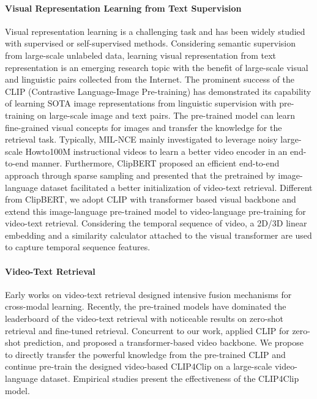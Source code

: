 \documentclass[11pt]{article}
\begin{document}
	\paragraph{Visual Representation Learning from Text Supervision}
    Visual representation learning is a challenging task and has been widely studied with supervised or self-supervised methods. Considering semantic supervision from large-scale unlabeled data, learning visual representation from text representation \cite{radford2021learning, miech19endtoend, lei2021less} is an emerging research topic with the benefit of large-scale visual and linguistic pairs collected from the Internet. The prominent success of the CLIP (Contrastive Language-Image Pre-training) \cite{radford2021learning} has demonstrated its capability of learning SOTA image representations from linguistic supervision with pre-training on large-scale image and text pairs. The pre-trained model can learn fine-grained visual concepts for images and transfer the knowledge for the retrieval task. Typically, MIL-NCE \cite{miech19endtoend} mainly investigated to leverage noisy large-scale Howto100M \cite{miech2019howto100m} instructional videos to learn a better video encoder in an end-to-end manner. Furthermore, ClipBERT \cite{lei2021less} proposed an efficient end-to-end approach through sparse sampling and presented that the pretrained by image-language dataset facilitated a better initialization of video-text retrieval. Different from ClipBERT, we adopt CLIP with transformer based visual backbone and extend this image-language pre-trained model to video-language pre-training for video-text retrieval. Considering the temporal sequence of video, a 2D/3D linear embedding and a similarity calculator attached to the visual transformer are used to capture temporal sequence features.

    \paragraph{Video-Text Retrieval}
	Early works on video-text retrieval \cite{Torabi2016Learning,kiros2014unifying,Yu2016Video,Kaufman2017Temporal,Yu2017End,yu2018joint}designed intensive fusion mechanisms for cross-modal learning. Recently, the pre-trained models \cite{Zhu_2020_CVPR,Amrani2020Noise,Luo2020UniVL,Li2020HERO,miech19endtoend,Gabeur2020MMT,patrick2021supportset,lei2021less,Dzabraev2021MDMMT,Liu2021HiT} have dominated the leaderboard of the video-text retrieval with noticeable results on zero-shot retrieval and fine-tuned retrieval. Concurrent to our work, \citet{PortilloQuintero2021} applied CLIP for zero-shot prediction, and \citet{Bain2021Frozen} proposed a transformer-based video backbone. We propose to directly transfer the powerful knowledge from the pre-trained CLIP and continue pre-train the designed video-based CLIP4Clip on a large-scale video-language dataset. Empirical studies present the effectiveness of the CLIP4Clip model.
\end{document}
